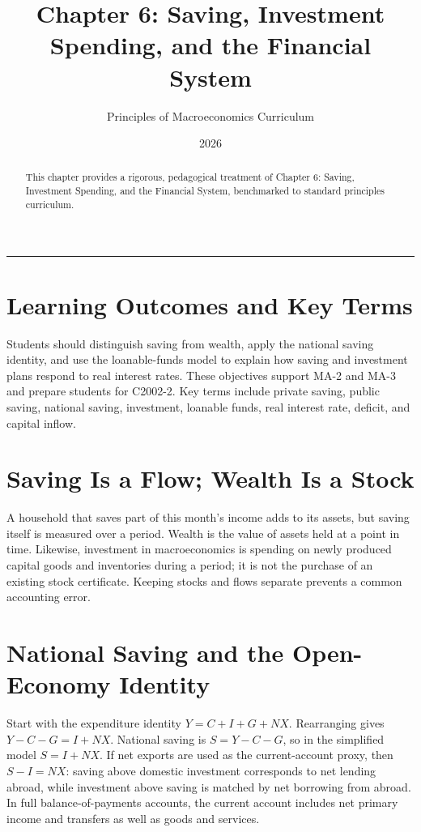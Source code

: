 \documentclass[11pt,letterpaper]{article}
\begin{document}
\title{\Huge\bfseries\color{SlateBlue} Chapter 6: Saving, Investment Spending, and the Financial System}
\author{\large Principles of Macroeconomics Curriculum}
\date{2026}
\maketitle

\thispagestyle{plain}

\begin{abstract}
This chapter provides a rigorous, pedagogical treatment of Chapter 6: Saving, Investment Spending, and the Financial System, benchmarked to standard principles curriculum.
\end{abstract}

\tableofcontents
\vspace{1.5em}
\hrule
\vspace{1.5em}

\section{Learning Outcomes and Key Terms}
Students should distinguish saving from wealth, apply the national saving identity, and use the loanable-funds model to explain how saving and investment plans respond to real interest rates. These objectives support MA-2 and MA-3 and prepare students for C2002-2. Key terms include private saving, public saving, national saving, investment, loanable funds, real interest rate, deficit, and capital inflow.

\section{Saving Is a Flow; Wealth Is a Stock}
A household that saves part of this month's income adds to its assets, but saving itself is measured over a period. Wealth is the value of assets held at a point in time. Likewise, investment in macroeconomics is spending on newly produced capital goods and inventories during a period; it is not the purchase of an existing stock certificate. Keeping stocks and flows separate prevents a common accounting error.

\section{National Saving and the Open-Economy Identity}
Start with the expenditure identity $Y=C+I+G+NX$. Rearranging gives $Y-C-G=I+NX$. National saving is $S=Y-C-G$, so in the simplified model $S=I+NX$. If net exports are used as the current-account proxy, then $S-I=NX$: saving above domestic investment corresponds to net lending abroad, while investment above saving is matched by net borrowing from abroad. In full balance-of-payments accounts, the current account includes net primary income and transfers as well as goods and services.
\end{document}

